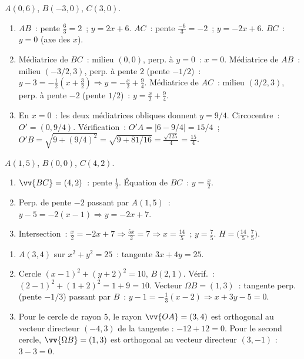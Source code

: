 $A(0,6)$, $B(-3,0)$, $C(3,0)$.
\begin{enumerate}
  \item $AB$~: pente $\frac{6}{3}=2$~; $y=2x+6$.
        $AC$~: pente $\frac{-6}{3}=-2$~; $y=-2x+6$.
        $BC$~: $y=0$ (axe des $x$).
  \item M\'ediatrice de $BC$~: milieu $(0,0)$, perp. \`a $y=0$~: $x=0$.
        M\'ediatrice de $AB$~: milieu $(-3/2,3)$, perp. \`a pente $2$ (pente $-1/2$)~:
        $y-3=-\frac{1}{2}(x+\frac{3}{2})\Rightarrow y=-\frac{x}{2}+\frac{9}{4}$.
        M\'ediatrice de $AC$~: milieu $(3/2,3)$, perp. \`a pente $-2$ (pente $1/2$)~:
        $y=\frac{x}{2}+\frac{9}{4}$.
  \item En $x=0$~: les deux m\'ediatrices obliques donnent $y=9/4$.
        Circocentre~: $O'=(0,9/4)$. V\'erification~:
        $O'A=|6-9/4|=15/4$~; $O'B=\sqrt{9+(9/4)^2}=\sqrt{9+81/16}=\frac{\sqrt{225}}{4}=\frac{15}{4}$.\checkmark
\end{enumerate}


$A(1,5)$, $B(0,0)$, $C(4,2)$.
\begin{enumerate}
  \item $\vv{BC}=(4,2)$~: pente $\frac{1}{2}$. \'Equation de $BC$~: $y=\frac{x}{2}$.
  \item Perp. de pente $-2$ passant par $A(1,5)$~: $y-5=-2(x-1)\Rightarrow y=-2x+7$.
  \item Intersection~: $\frac{x}{2}=-2x+7\Rightarrow\frac{5x}{2}=7\Rightarrow x=\frac{14}{5}$~;
        $y=\frac{7}{5}$. $H=\bigl(\frac{14}{5},\frac{7}{5}\bigr)$.
\end{enumerate}


\begin{enumerate}
  \item $A(3,4)$ sur $x^2+y^2=25$~: tangente $3x+4y=25$.
  \item Cercle $(x-1)^2+(y+2)^2=10$, $B(2,1)$.
        V\'erif.~: $(2-1)^2+(1+2)^2=1+9=10$.\checkmark
        Vecteur $\Omega B=(1,3)$~: tangente perp. (pente $-1/3$) passant par $B$~:
        $y-1=-\frac{1}{3}(x-2)\Rightarrow x+3y-5=0$.
  \item Pour le cercle de rayon $5$, le rayon $\vv{OA}=(3,4)$ est orthogonal
        au vecteur directeur $(-4,3)$ de la tangente : $-12+12=0$.
        Pour le second cercle, $\vv{\Omega B}=(1,3)$ est orthogonal
        au vecteur directeur $(3,-1)$ : $3-3=0$.
\end{enumerate}

